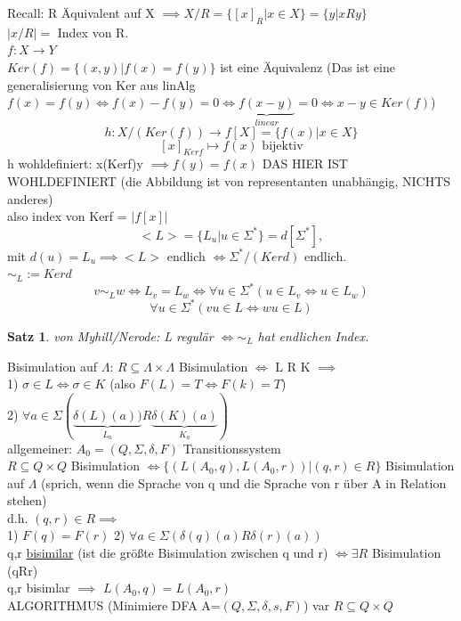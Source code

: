 \documentclass{article}
\newtheorem{satz}{Satz}
\theoremstyle{definition}
\begin{document}
	 Recall:  R Äquivalent auf X $\implies X/R =\{[x]_R|x\in X\} = \{y|xRy\}$\\
	 $|x/R| =$ Index von R.\\
	 $f: X\to Y$\\
	 $Ker (f) = \{(x,y)| f(x) = f(y)\}$ ist eine Äquivalenz (Das ist eine generalisierung von Ker aus linAlg $f(x)=f(y)\iff f(x)-f(y)=0\iff \underbrace{f(x-y)}_{linear} =0\iff x-y\in Ker(f)$)\\
	 \[h: X/(Ker(f))\to f[X] =\{f(x) | x\in X\}\]
	 \[[x]_{Kerf} \mapsto f(x) \text{  bijektiv}\]
	 h wohldefiniert: x(Kerf)y $\implies f(y)=f(x)$ DAS HIER IST WOHLDEFINIERT (die Abbildung ist von representanten unabhängig, NICHTS anderes)\\
	 also index von Kerf = $|f[x]|$
	 \[<L> = \{L_u | u\in \Sigma^*\} = d[\Sigma^*],\]
	 mit $d(u) = L_u\implies <L>$ endlich $\iff \Sigma^*/(Kerd)$ endlich.\\
	 $\sim_L := Kerd$
	 \[v\sim_L w\iff L_v = L_w \iff \forall u\in \Sigma^* (u\in L_v \iff u\in L_w)\]
	 \[\forall u\in \Sigma^* (vu\in L\iff wu\in L)\]
	 \begin{satz} von Myhill/Nerode: L regulär $\iff \sim_L$ hat endlichen Index.\end{satz}
	 Bisimulation auf $\Lambda$: $R\subseteq \Lambda\times\Lambda$ Bisimulation $\iff$ L R K $\implies$\\
	 1) $\sigma\in L\iff \sigma\in K$ (also $F(L)=T\iff F(k)=T$)\\
	 2) $\forall a\in \Sigma(\underbrace{\delta(L)(a))}_{L_a} R \underbrace{\delta(K)(a)}_{K_a})$\\
	 allgemeiner: $A_0 = (Q,\Sigma,\delta,F)$ Transitionssystem\\
	 $R\subseteq Q\times Q$ Bisimulation $\iff \{(L(A_0,q),L(A_0,r))| (q,r)\in R\}$ Bisimulation auf $\Lambda$ (sprich, wenn die Sprache von q und die Sprache von r über A in Relation stehen)\\
	 d.h. $(q,r)\in R\implies$\\
	 1) $F(q)=F(r)$
	 2) $\forall a\in\Sigma(\delta(q)(a)R\delta(r)(a))$\\
	 q,r \underline{bisimilar} (ist die größte Bisimulation zwischen q und r) $\iff \exists R$ Bisimulation (qRr)\\
	 q,r bisimlar $\implies$ $L(A_0,q)=L(A_0,r)$\\
	 ALGORITHMUS (Minimiere DFA A=$(Q,\Sigma,\delta,s,F)$)
	 var $R\subseteq Q\times Q$
\end{document}
